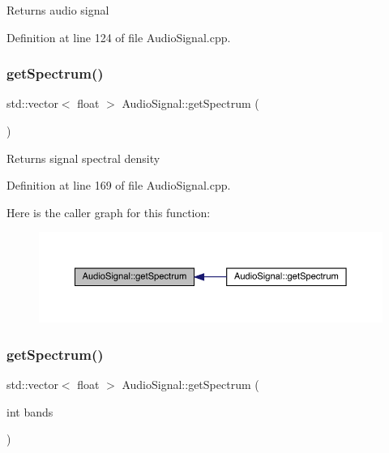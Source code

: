 \begin{DoxyReturn}{Returns}
audio signal 
\end{DoxyReturn}


Definition at line 124 of file Audio\+Signal.\+cpp.

\mbox{\label{class_audio_signal_a1c1330b11b635cfafe2edb75fd0d2e70}} 
\subsubsection{\texorpdfstring{get\+Spectrum()}{getSpectrum()}\hspace{0.1cm}{\footnotesize\ttfamily [1/2]}}
{\footnotesize\ttfamily std\+::vector$<$ float $>$ Audio\+Signal\+::get\+Spectrum (\begin{DoxyParamCaption}{ }\end{DoxyParamCaption})}

\begin{DoxyReturn}{Returns}
signal spectral density 
\end{DoxyReturn}


Definition at line 169 of file Audio\+Signal.\+cpp.

Here is the caller graph for this function\+:
\nopagebreak
\begin{figure}[H]
\begin{center}
\leavevmode
\includegraphics[width=350pt]{class_audio_signal_a1c1330b11b635cfafe2edb75fd0d2e70_icgraph}
\end{center}
\end{figure}
\mbox{\label{class_audio_signal_ae49bd4dc391e6ae0e8a673ff8d5089fb}} 
\subsubsection{\texorpdfstring{get\+Spectrum()}{getSpectrum()}\hspace{0.1cm}{\footnotesize\ttfamily [2/2]}}
{\footnotesize\ttfamily std\+::vector$<$ float $>$ Audio\+Signal\+::get\+Spectrum (\begin{DoxyParamCaption}\item[{int}]{bands }\end{DoxyParamCaption})}


